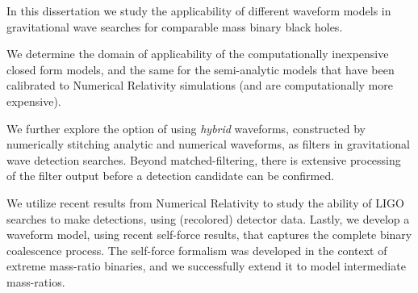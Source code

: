 
In this dissertation we study the applicability of different waveform models 
in gravitational wave searches for comparable mass binary black holes.

We determine the domain of applicability of the computationally inexpensive closed 
form models, and the same for the semi-analytic models that have been calibrated
to Numerical Relativity simulations (and are computationally more expensive).

We further explore the option of using {\it hybrid} waveforms, constructed 
by numerically stitching analytic and numerical waveforms, as filters in
gravitational wave detection searches. Beyond matched-filtering, there 
is extensive processing of the filter output before a detection candidate can
be confirmed. 

We utilize recent results from Numerical Relativity to study
the ability of LIGO searches to make detections, using (recolored) detector data.
Lastly, we develop a waveform model, using recent self-force results, that 
captures the complete binary coalescence process. The self-force formalism was
developed in the context of extreme mass-ratio binaries, and we successfully
extend it to model intermediate mass-ratios.
